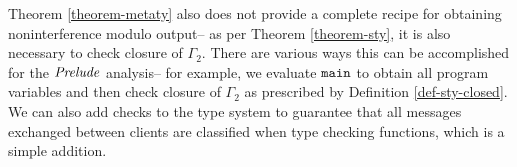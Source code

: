 Theorem \ref{theorem-metaty} also does not provide a complete recipe
for obtaining noninterference modulo output-- as per Theorem
\ref{theorem-sty}, it is also necessary to check closure of
$\Gamma_2$. There are various ways this can be accomplished for the
$\mathit{Prelude}$ analysis-- for example, we evaluate $\texttt{main}$ to obtain
all program variables and then check closure of $\Gamma_2$ as
prescribed by Definition \ref{def-sty-closed}. We can also add checks
to the type system to guarantee that all messages exchanged between
clients are classified when type checking functions, which is
a simple addition.

